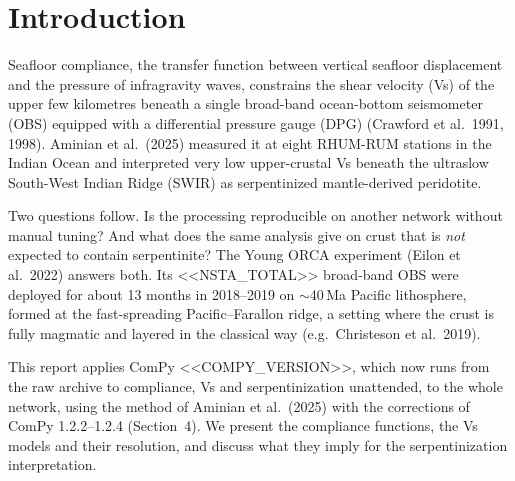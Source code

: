 \documentclass[10pt,a4paper,twocolumn]{article}
\begin{document}
\section{Introduction}
Seafloor compliance, the transfer function between vertical seafloor displacement and the pressure of
infragravity waves, constrains the shear velocity (Vs) of the upper few kilometres beneath a single broad-band
ocean-bottom seismometer (OBS) equipped with a differential pressure gauge (DPG) (Crawford et al.\ 1991, 1998).
Aminian et al.\ (2025) measured it at eight RHUM-RUM stations in the Indian Ocean and interpreted very low upper-crustal Vs
beneath the ultraslow South-West Indian Ridge (SWIR) as serpentinized mantle-derived peridotite.

Two questions follow. Is the processing reproducible on another network without manual tuning? And what does
the same analysis give on crust that is \emph{not} expected to contain serpentinite? The Young ORCA experiment
(Eilon et al.\ 2022) answers both. Its <<NSTA_TOTAL>> broad-band OBS were deployed for about 13 months in 2018--2019 on
$\sim$40\,Ma Pacific lithosphere, formed at the fast-spreading Pacific--Farallon ridge, a setting where the crust is
fully magmatic and layered in the classical way (e.g.\ Christeson et al.\ 2019).

This report applies ComPy <<COMPY_VERSION>>, which now runs from the raw archive to compliance, Vs and
serpentinization unattended, to the whole network, using the method of Aminian et al.\ (2025) with the corrections
of ComPy 1.2.2--1.2.4 (Section~4). We present the compliance functions, the Vs models and their resolution, and
discuss what they imply for the serpentinization interpretation.
\end{document}
